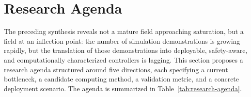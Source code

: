 \documentclass[manuscript,screen,review]{acmart}
\begin{document}
\section{Research Agenda}
\label{sec:agenda}

The preceding synthesis reveals not a mature field approaching saturation, but a field at an inflection point: the number of simulation demonstrations is growing rapidly, but the translation of those demonstrations into deployable, safety-aware, and computationally characterized controllers is lagging.
This section proposes a research agenda structured around five directions, each specifying a current bottleneck, a candidate computing method, a validation metric, and a concrete deployment scenario.
The agenda is summarized in Table~\ref{tab:research-agenda}.
\end{document}
